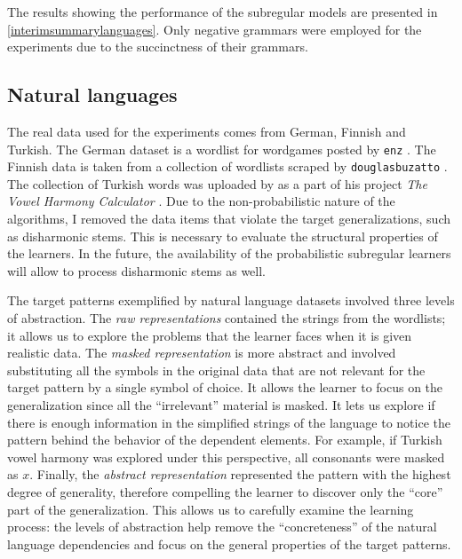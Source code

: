 The results showing the performance of the subregular models are presented in \ref{interimsummarylanguages}.
Only negative grammars were employed for the experiments due to the succinctness of their grammars.


\subsection{Natural languages}

The real data used for the experiments comes from German, Finnish and Turkish.
The German dataset is a wordlist for wordgames posted by \texttt{enz} \href{https://github.com/enz/german-wordlist}{\faGithub} \citep{GHenz}.
The Finnish data is taken from a collection of wordlists scraped by \texttt{douglasbuzatto} \href{https://github.com/douglasbuzatto/WordLists}{\faGithub} \citep{GHdouglasbuzatto}.
The collection of Turkish words was uploaded by \cite{HarrisonEtAl2004} as a part of his project \emph{The Vowel Harmony Calculator} \href{http://www.swarthmore.edu/SocSci/harmony/public_html/dummyresults.html}{\faChain}.
Due to the non-probabilistic nature of the algorithms, I removed the data items that violate the target generalizations, such as disharmonic stems.
This is necessary to evaluate the structural properties of the learners.
In the future, the availability of the probabilistic subregular learners will allow to process disharmonic stems as well.

The target patterns exemplified by natural language datasets involved three levels of abstraction.
The \emph{raw representations} contained the strings from the wordlists; it allows us to explore the problems that the learner faces when it is given realistic data.
The \emph{masked representation} is more abstract and involved substituting all the symbols in the original data that are not relevant for the target pattern by a single symbol of choice.
It allows the learner to focus on the generalization since all the ``irrelevant'' material is masked.
It lets us explore if there is enough information in the simplified strings of the language to notice the pattern behind the behavior of the dependent elements.
For example, if Turkish vowel harmony was explored under this perspective, all consonants were masked as $x$.
Finally, the \emph{abstract representation} represented the pattern with the highest degree of generality, therefore compelling the learner to discover only the ``core'' part of the generalization.
This allows us to carefully examine the learning process: the levels of abstraction help remove the ``concreteness'' of the natural language dependencies and focus on the general properties of the target patterns.


